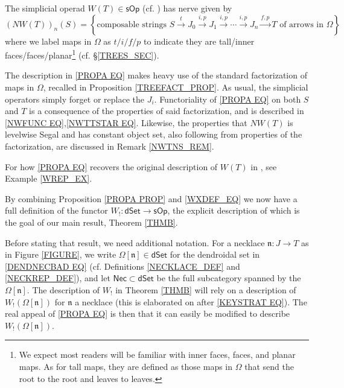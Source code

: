 \documentclass{hha}
\theoremstyle{definition} %
\newcommand{\sOp}{\mathsf{sOp}}
\newcommand{\dSet}{\mathsf{dSet}}
\begin{document}
\begin{proposition}\label{PROPA PROP}
        The simplicial operad $W(T) \in \sOp$
        (cf. \cite[(4.1)]{CM13b})
        has nerve given by
        \begin{equation}\label{PROPA EQ}
                \left(NW(T)\right)_{n}(S)
                =
                \left\{
                        \text{composable strings }
                        S \xrightarrow{t} 
                        J_0 \xrightarrow{i,p} 
                        J_1 \xrightarrow{i,p} 
                        \cdots \xrightarrow{i,p}
                        J_n \xrightarrow{f,p}
                        T
                        \text{ of arrows in $\Omega$}
                \right\}
        \end{equation}
        where we label maps in $\Omega$ as
        $t/i/f/p$
        to indicate they are 
        tall/inner faces/faces/planar\footnote{
          We expect most readers will be familiar with inner faces, faces, and planar maps. 
          As for tall maps, they are defined 
          as those maps in $\Omega$
          that send the root to the root and leaves to leaves.
        }
        (cf. \S \ref{TREES_SEC}).
\end{proposition}
The description in \eqref{PROPA EQ}
makes heavy use of the standard factorization of maps in $\Omega$,
recalled in Proposition \ref{TREEFACT_PROP}.
As usual, the simplicial operators simply forget or replace the $J_i$.
Functoriality of \eqref{PROPA EQ} on both $S$ and $T$
is a consequence of the properties of said factorization,
and is described in \eqref{NWFUNC EQ},\eqref{NWTTSTAR EQ}.
Likewise, the properties that 
$NW(T)$ is levelwise Segal and 
has constant object set, also following from properties of the factorization, are discussed in Remark \ref{NWTNS_REM}.

For how \eqref{PROPA EQ}
recovers the original description of $W(T)$ in \cite[(4.1)]{CM13b},
see Example \ref{WREP_EX}.


\vskip 10pt


	By combining Proposition \ref{PROPA PROP} and \eqref{WXDEF_EQ}
	we now have a full definition of the functor
	$W_! \colon \mathsf{dSet} \to \sOp$,
	the explicit description of which is the goal of our main result, Theorem \ref{THMB}.

	
	Before stating that result, we need additional notation.
	For a necklace $\mathfrak{n}\colon J \to T$ as in Figure \ref{FIGURE},
	we write $\Omega[\mathfrak{n}] \in \dSet$
	for the dendroidal set in \eqref{DENDNECBAD EQ}
	(cf. Definitions \ref{NECKLACE_DEF} 
	and \ref{NECKREP_DEF}),
	and let $\mathsf{Nec} \subset \dSet$
	be the full subcategory spanned by the $\Omega[\mathfrak{n}]$. 
	The description of $W_!$ in Theorem \ref{THMB}
	will rely on a description 
	of $W_!(\Omega[\mathfrak{n}])$
	for $\mathfrak{n}$ a necklace 
	(this is elaborated on after \eqref{KEYSTRAT EQ}).
	The real appeal of \eqref{PROPA EQ}
	is then that it can easily be modified to describe
	$W_!(\Omega[\mathfrak{n}])$.
        
\end{document}
